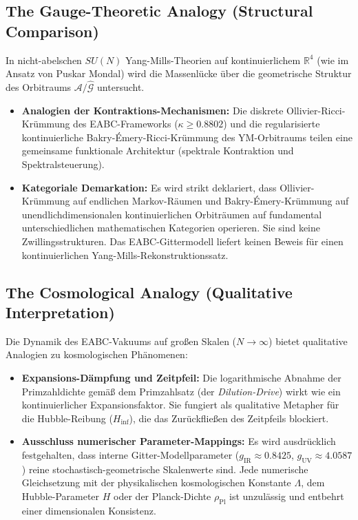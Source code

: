 \documentclass[11pt,a4paper]{article}
\begin{document}
	\subsection{The Gauge-Theoretic Analogy (Structural Comparison)}
	In nicht-abelschen $SU(N)$ Yang-Mills-Theorien auf kontinuierlichem $\mathbb{R}^4$ (wie im Ansatz von Puskar Mondal) wird die Massenlücke über die geometrische Struktur des Orbitraums $\mathcal{A}/\hat{\mathcal{G}}$ untersucht.
	\begin{itemize}
		\item \textbf{Analogien der Kontraktions-Mechanismen:} Die diskrete Ollivier-Ricci-Krümmung des EABC-Frameworks ($\kappa \ge 0.8802$) und die regularisierte kontinuierliche Bakry-Émery-Ricci-Krümmung des YM-Orbitraums teilen eine gemeinsame funktionale Architektur (spektrale Kontraktion und Spektralsteuerung).
		\item \textbf{Kategoriale Demarkation:} Es wird strikt deklariert, dass Ollivier-Krümmung auf endlichen Markov-Räumen und Bakry-Émery-Krümmung auf unendlichdimensionalen kontinuierlichen Orbiträumen auf fundamental unterschiedlichen mathematischen Kategorien operieren. Sie sind keine Zwillingsstrukturen. Das EABC-Gittermodell liefert keinen Beweis für einen kontinuierlichen Yang-Mills-Rekonstruktionssatz.
	\end{itemize}
	
	\subsection{The Cosmological Analogy (Qualitative Interpretation)}
	Die Dynamik des EABC-Vakuums auf großen Skalen ($N \to \infty$) bietet qualitative Analogien zu kosmologischen Phänomenen:
	\begin{itemize}
		\item \textbf{Expansions-Dämpfung und Zeitpfeil:} Die logarithmische Abnahme der Primzahldichte gemäß dem Primzahlsatz (der \textit{Dilution-Drive}) wirkt wie ein kontinuierlicher Expansionsfaktor. Sie fungiert als qualitative Metapher für die Hubble-Reibung ($H_{\text{inf}}$), die das Zurückfließen des Zeitpfeils blockiert.
		\item \textbf{Ausschluss numerischer Parameter-Mappings:} Es wird ausdrücklich festgehalten, dass interne Gitter-Modellparameter ($g_{\text{IR}} \approx 0.8425$, $g_{\text{UV}} \approx 4.0587$) reine stochastisch-geometrische Skalenwerte sind. Jede numerische Gleichsetzung mit der physikalischen kosmologischen Konstante $\Lambda$, dem Hubble-Parameter $H$ oder der Planck-Dichte $\rho_{\text{Pl}}$ ist unzulässig und entbehrt einer dimensionalen Konsistenz.
	\end{itemize}
	
\end{document}
